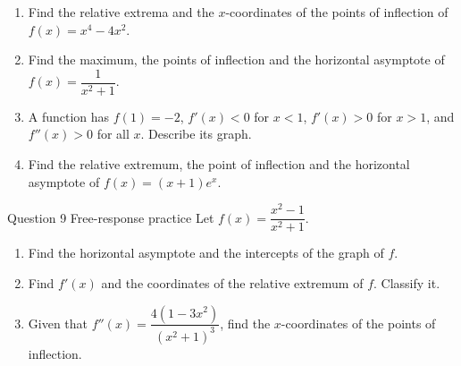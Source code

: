 \documentclass[11pt]{article}
\begin{document}
\begin{enumerate}[leftmargin=*,itemsep=2pt,start=5]
  \item Find the relative extrema and the $x$-coordinates of the points of inflection of $f(x)=x^4-4x^2$.\work{2.8cm}
  \item Find the maximum, the points of inflection and the horizontal asymptote of $f(x)=\dfrac{1}{x^2+1}$.\work{2.8cm}
  \item A function has $f(1)=-2$, $f'(x)<0$ for $x<1$, $f'(x)>0$ for $x>1$, and $f''(x)>0$ for all $x$. Describe its graph.\work{2.8cm}
  \item Find the relative extremum, the point of inflection and the horizontal asymptote of $f(x)=(x+1)e^{x}$.\work{2.8cm}
\end{enumerate}

\begin{frbox}{Question 9 \textperiodcentered{} Free-response practice}
Let $f(x)=\dfrac{x^2-1}{x^2+1}$.
\begin{enumerate}[label=(\alph*),leftmargin=*,itemsep=2pt]
  \item Find the horizontal asymptote and the intercepts of the graph of $f$.\work{2.6cm}
  \item Find $f'(x)$ and the coordinates of the relative extremum of $f$. Classify it.\work{2.6cm}
  \item Given that $f''(x)=\dfrac{4\left(1-3x^2\right)}{\left(x^2+1\right)^3}$, find the $x$-coordinates of the points of inflection.\work{2.6cm}
\end{enumerate}
\end{frbox}
\end{document}
